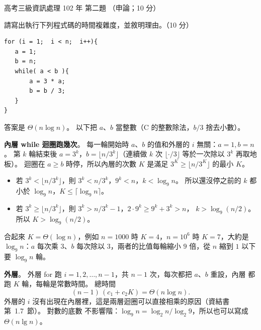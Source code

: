 \begin{pastexam}[label={px:gk3-102-ds-02}]{高考三級資訊處理 102 年 第二題}
（申論；10 分）

請寫出執行下列程式碼的時間複雜度，並敘明理由。（10 分）
\begin{verbatim}
for (i = 1;  i < n;  i++){
   a = 1;
   b = n;
   while( a < b ){
       a = 3 * a;
       b = b / 3;
   }
}
\end{verbatim}
\end{pastexam}

\begin{pastsoln}
答案是 $\Theta(n \log n)$。 以下把 $a$、$b$ 當整數（C 的整數除法，$b / 3$ 捨去小數）。

\textbf{內層 while 迴圈跑幾次}。 每一輪開始時 $a$、$b$ 的值和外層的 $i$ 無關：$a = 1, b = n$。
第 $k$ 輪結束後 $a = 3^k$，$b = \lfloor n / 3^k \rfloor$（連續做 $k$ 次 $\lfloor \cdot / 3 \rfloor$
等於一次除以 $3^k$ 再取地板）。 迴圈在 $a \ge b$ 時停，所以內層的次數 $K$ 是滿足
$3^K \ge \lfloor n / 3^K \rfloor$ 的最小 $K$。
\begin{itemize}
\item 若 $3^k < \lfloor n/3^k \rfloor$，則 $3^k < n/3^k$，$9^k < n$，$k < \log_9 n$。 所以還沒停之前的
$k$ 都小於 $\log_9 n$，$K \le \lceil \log_9 n \rceil$。
\item 若 $3^k \ge \lfloor n/3^k \rfloor$，則 $3^k > n/3^k - 1$，$2 \cdot 9^k \ge 9^k + 3^k > n$，
$k > \log_9 (n/2)$。 所以 $K > \log_9 (n/2)$。
\end{itemize}
合起來 $K = \Theta(\log n)$，例如 $n = 1000$ 時 $K = 4$，$n = 10^6$ 時 $K = 7$，大約是
$\log_9 n$：$a$ 每次乘 $3$、$b$ 每次除以 $3$，兩者的比值每輪縮小 $9$ 倍，從 $n$ 縮到 $1$
以下要 $\log_9 n$ 輪。

\textbf{外層}。 外層 for 跑 $i = 1, 2, \ldots, n - 1$，共 $n - 1$ 次，每次都把 $a$、$b$ 重設，內層
都跑 $K$ 輪，每輪是常數時間。 總時間
\[
(n - 1)\,(c_1 + c_2 K) = \Theta(n \log n).
\]
外層的 $i$ 沒有出現在內層裡，這是兩層迴圈可以直接相乘的原因（資結書第~1.7~節）。 對數的底數
不影響階：$\log_9 n = \log_2 n / \log_2 9$，所以也可以寫成 $\Theta(n \lg n)$。
\end{pastsoln}
